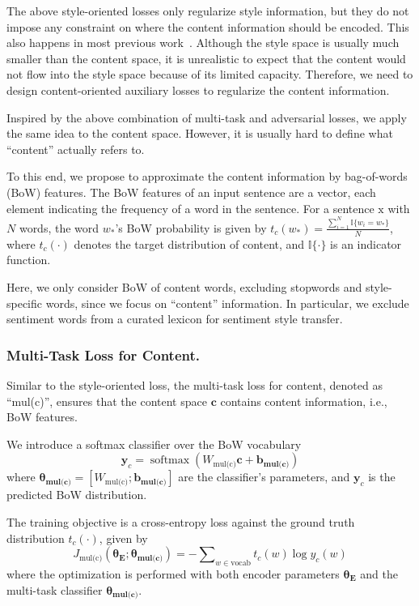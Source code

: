 \documentclass[letterpaper]{article} %
\newcommand{\rmx}{\mathrm x}
\newcommand{\loss}[1]{J_{\text{#1}}}
\newcommand{\nnweight}[1]{\bm{\theta_{\text{#1}}}}
\newcommand{\weight}[1]{W_{\text{#1}}}
\newcommand{\bias}[1]{\bm{b_{\text{#1}}}}
\begin{document}
The above style-oriented losses only regularize style information, but they do not impose any constraint on where the content information should be encoded. This also happens in most previous work~\cite{hu2017toward,shen2017style,fu2018style}.
Although the style space is usually much smaller than the content space, it is unrealistic to expect that the content would not flow into the style space because of its limited capacity. Therefore, we need to design content-oriented auxiliary losses to regularize the content information.

Inspired by the above combination of multi-task and adversarial losses, we apply the same idea to the content space. However, it is usually hard to define what ``content'' actually refers to.

To this end, we propose to approximate the content information by bag-of-words (BoW) features.
The BoW features of an input sentence  are a vector, each element indicating the frequency of a word in the sentence.
For a sentence $\rmx$ with $N$ words, the word $w_*$'s BoW probability is given by
$t_c(w_*)=\frac{\sum_{i=1}^{N}{\mathbb{I}\{w_i = w_*\}}}{N}$,
where $t_c(\cdot)$ denotes the target distribution of content, and $\mathbb{I\{\cdot\}}$ is an indicator function.

Here, we only consider BoW of content words, excluding stopwords and style-specific words, since we focus on ``content'' information. In particular, we exclude sentiment words from a curated lexicon \cite{hu2004mining} for sentiment style transfer.


\subsubsection{Multi-Task Loss for Content.} \label{ssec:multitask-content-objective}

Similar to the style-oriented loss, the multi-task loss for content, denoted as ``mul(c)'', ensures that the content space $\bm c$ contains content information, i.e., BoW features.

We introduce a softmax classifier over the BoW vocabulary
\begin{equation} \label{eqn:bow-pred}
	\bm y_c = \operatorname{softmax}({\weight{mul(c)}} \bm c + \bias{mul(c)})
\end{equation}
where $\nnweight{mul(c)}=[\weight{mul(c)}; \bias{mul(c)}]$ are the classifier's parameters, and $\bm y_c$ is the predicted BoW distribution.

The training objective is a cross-entropy loss against the ground truth distribution $t_c(\cdot)$, given by
\begin{equation}\label{eqn:content-multi-task-loss}
	\loss{mul(c)}(\nnweight{E};\nnweight{mul(c)}) = - \sum\nolimits_{w\in\text{vocab}} t_c(w)\log y_c(w)
\end{equation}
where the optimization is performed with both encoder parameters $\nnweight{E}$ and the multi-task classifier $\nnweight{mul(c)}$.
\end{document}

